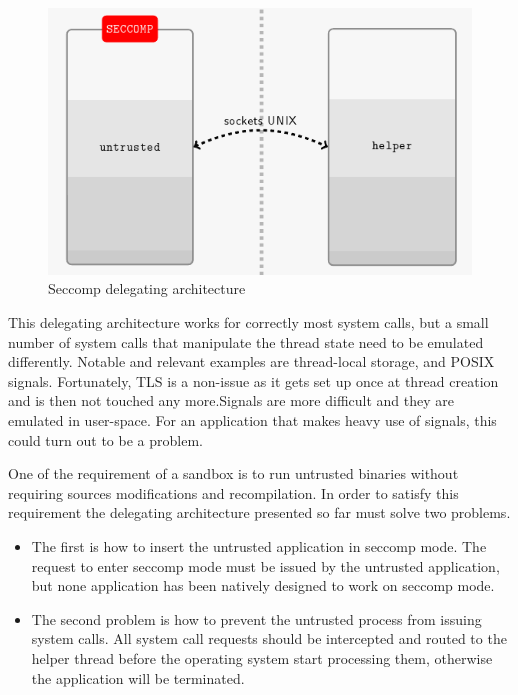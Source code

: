\begin{figure}[b]
\centering
\includegraphics[scale=0.5]{Chapter3/Chapter3Figs/seccomp.png} 
\caption{Seccomp delegating architecture}
\label{fig:seccomp}
\end{figure}


This delegating architecture works for correctly most system calls, but a small number of system calls that manipulate the thread state need to be emulated differently. Notable and relevant examples are thread-local storage, and POSIX signals. Fortunately, TLS is a non-issue as it gets set up once at thread creation and is then not touched any more.Signals are more difficult and they are emulated in user-space. For an application that makes heavy use of signals, this could turn out to be a problem.

One of the requirement of a sandbox is to run untrusted binaries without requiring sources modifications and recompilation. In order to satisfy this requirement the delegating architecture presented so far must solve two problems. 
\begin{itemize}
\item  The first is how to insert the untrusted application in seccomp mode. The request to enter seccomp mode must be issued by the untrusted application, but none application 		   has been natively designed to work on seccomp mode.
\item The second problem is how to prevent the untrusted process from issuing system calls. All system call requests should be intercepted and routed to the helper thread before 		  the operating system start processing them, otherwise the application will be terminated. 
\end{itemize}

